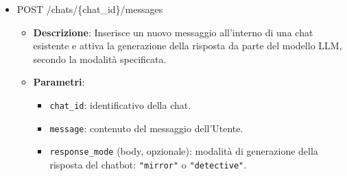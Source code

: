 \documentclass[a4paper,12pt]{article}
\newcommand{\code}[1]{{\ttfamily\textcolor{purple!85!black}{#1}}}
\begin{document}
\begin{itemize}
\begin{itemize}
            \item \textbf{Parametri}:
            \begin{itemize}
                \item \texttt{chat\_id}: identificativo della chat.
            \end{itemize}
        
            \item \textbf{Response}:
            \begin{itemize}
                \item \texttt{204 No Content}: eliminazione completata con successo.
                \item Corpo della risposta: vuoto.
            \end{itemize}
        
            \item \textbf{Errori}:
            \begin{itemize}
                \item \texttt{404 Not Found}: chat non trovata.
                \item \texttt{400 Bad Request}: parametri non validi.
                \item \texttt{500 Internal Server Error}: errore interno del server.
            \end{itemize}
        \end{itemize}
    
    \item \code{POST /chats/\{chat\_id\}/messages}
        \begin{itemize}
            \item \textbf{Descrizione}: Inserisce un nuovo messaggio all’interno di una chat esistente e attiva la generazione della risposta da parte del modello LLM, secondo la modalità specificata.

            \item \textbf{Parametri}:
            \begin{itemize}
                \item \texttt{chat\_id}: identificativo della chat.
                \item \texttt{message}: contenuto del messaggio dell’Utente.
                \item \texttt{response\_mode} (body, opzionale): modalità di generazione della risposta del chatbot: \texttt{"mirror"} o \texttt{"detective"}.
            \end{itemize}


\end{itemize}
\end{itemize}
\end{document}
